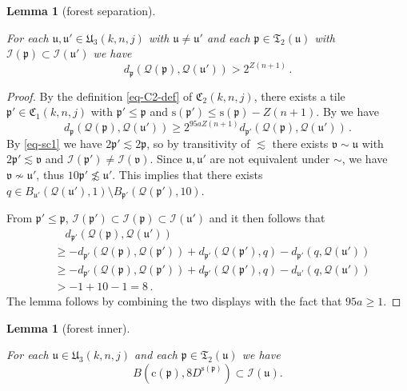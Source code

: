 \documentclass[10pt,a4paper]{article}
\theoremstyle{plain}
\newtheorem{lemma}[theorem]{Lemma}
\theoremstyle{definition}
\numberwithin{equation}{subsection}
\newcommand{\fp}{{\mathfrak p}}
\newcommand{\fu}{{\mathfrak u}}
\newcommand{\fU}{{\mathfrak U}}
\newcommand{\fT}{{\mathfrak T}}
\newcommand{\fC}{{\mathfrak C}}
\newcommand{\pc}{{\mathrm{c}}}
\newcommand{\ps}{{\mathrm{s}}}
\newcommand{\scI}{{\mathcal{I}}} %
\newcommand{\fcc}{{\mathcal{Q}}}
\newcommand{\lean}[1]{}
\newcommand{\uses}[1]{}
\newcommand{\leanok}{}
\begin{document}
\begin{lemma}[forest separation]
    \label{forest-separation}
    \uses{monotone-cube-metrics}
    \leanok
    \lean{forest_separation}
    For each $\fu,\fu'\in \fU_3(k,n,j)$ with $\fu\neq \fu'$ and each $\fp \in \fT_2(\fu)$
    with $\scI(\fp)\subset \scI(\fu')$ we have
    \begin{equation}
    d_{\fp}(\fcc(\fp), \fcc(\fu')) > 2^{Z(n+1)}\,.
    \end{equation}
\end{lemma}

\begin{proof}
    \leanok
    By the definition \eqref{eq-C2-def} of $\fC_2(k,n,j)$, there exists a tile $\fp' \in \fC_1(k,n,j)$ with $\fp' \le \fp$ and $\ps(\fp') \le \ps(\fp)- Z(n+1)$.
    By  we have
    $$
        d_{\fp}(\fcc(\fp), \fcc(\fu')) \ge 2^{95a Z(n+1)} d_{\fp'}(\fcc(\fp), \fcc(\fu'))\,.
    $$
    By \eqref{eq-sc1} we have $2\fp' \lesssim 2\fp$, so by transitivity of $\lesssim$ there exists $\mathfrak{v} \sim \fu$ with $2\fp' \lesssim \mathfrak{v}$ and $\scI(\fp') \ne \scI(\mathfrak{v})$. Since $\fu, \fu'$ are not equivalent under $\sim$, we have $\mathfrak{v} \not \sim \fu'$, thus $10\fp' \not\lesssim \fu'$. This implies that there exists $q \in B_{\fu'}(\fcc(\fu'), 1) \setminus B_{\fp'}(\fcc(\fp'), 10)$.

    From $\fp' \le \fp$, $\scI(\fp') \subset \scI(\fp) \subset \scI(\fu')$ and  it then follows that
    \begin{align*}
        &\quad d_{\fp'}(\fcc(\fp), \fcc(\fu'))\\
        &\ge -d_{\fp'}(\fcc(\fp), \fcc(\fp')) + d_{\fp'}(\fcc(\fp'), q) - d_{\fp'}(q, \fcc(\fu'))\\
        &\ge -d_{\fp'}(\fcc(\fp), \fcc(\fp')) + d_{\fp'}(\fcc(\fp'), q) - d_{\fu'}(q, \fcc(\fu'))\\
        &> -1 + 10 - 1 = 8\,.
    \end{align*}
    The lemma follows by combining the two displays with the fact that $95 a \ge 1$.
\end{proof}

\begin{lemma}[forest inner]
    \label{forest-inner}
    \uses{relation-geometry}
    \leanok
    \lean{forest_inner}
    For each $\fu\in \fU_3(k,n,j)$
    and each $\fp \in \mathfrak{T}_2(\fu)$
    we have
    \begin{equation}
        B(\pc(\fp), 8 D^{\ps(\fp)}) \subset \scI(\fu).
    \end{equation}
\end{lemma}
\end{document}
